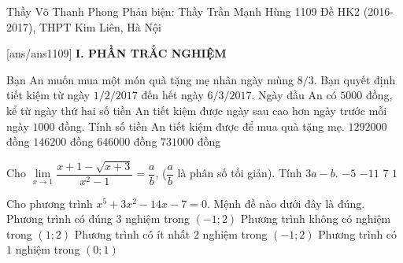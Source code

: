 \begin{name}
{Thầy Võ Thanh Phong \newline Phản biện: Thầy Trần Mạnh Hùng}
{1109 Đề HK2 (2016-2017), THPT Kim Liên, Hà Nội}%
	\end{name}
	\setcounter{ex}{0}\setcounter{bt}{0}
	[ans/ans1109]
\noindent\textbf{I. PHẦN TRẮC NGHIỆM}
\begin{ex}%
	Bạn An muốn mua một món quà tặng mẹ nhân ngày mùng $8/3$. Bạn quyết định tiết kiệm từ ngày $1/2/2017$ đến hết ngày $6/3/2017$. Ngày đầu An có $5000$ đồng, kể từ ngày thứ hai số tiền An tiết kiệm được ngày sau cao hơn ngày trước mỗi ngày $1000$ đồng. Tính số tiền An tiết kiệm được để mua quà tặng mẹ.
	\choice
	{$1292000$ đồng}
	{$146200$ đồng}
	{$646000$ đồng}
	{\True $731000$ đồng}
\end{ex}
\begin{ex}%
	Cho $\lim \limits_{x\to 1} \dfrac{x+1-\sqrt{x+3}}{x^2-1}=\dfrac{a}{b}$, ($\dfrac{a}{b}$ là phân số tối giản). Tính $3a-b$.
	\choice
	{$ -5$}
	{$ -11$}
	{$7$}
	{\True $1$}
\end{ex}
\begin{ex}%
	Cho phương trình $x^5+3x^2-14x-7=0$. Mệnh đề nào dưới đây là đúng.
	\choice
	{Phương trình có đúng $3$ nghiệm trong $\left(-1;2\right)$}
	{Phương trình không có nghiệm trong $\left(1;2\right)$}
	{\True Phương trình có ít nhất $2$ nghiệm trong $\left(-1;2\right)$}
	{Phương trình có  $1$ nghiệm trong $\left(0;1\right)$}
\end{ex}
